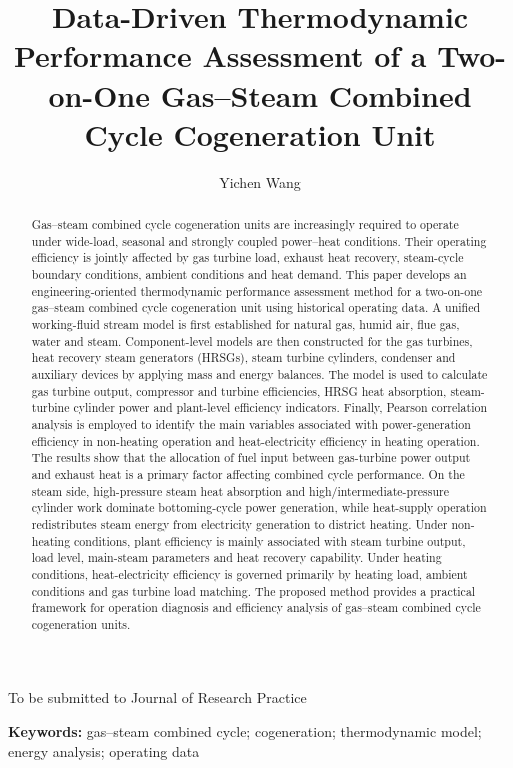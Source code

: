 \documentclass[12pt,a4paper]{article}
\title{\textbf{Data-Driven Thermodynamic Performance Assessment of a Two-on-One Gas--Steam Combined Cycle Cogeneration Unit}}
\author[1]{Yichen Wang}
\affil[1]{Department of Energy and Power Engineering, Tsinghua University, Beijing 100084, China}
\date{}
\begin{document}
\begin{center}
\small To be submitted to Journal of Research Practice
\end{center}
\maketitle

\begin{abstract}
Gas--steam combined cycle cogeneration units are increasingly required to operate under wide-load, seasonal and strongly coupled power--heat conditions. Their operating efficiency is jointly affected by gas turbine load, exhaust heat recovery, steam-cycle boundary conditions, ambient conditions and heat demand. This paper develops an engineering-oriented thermodynamic performance assessment method for a two-on-one gas--steam combined cycle cogeneration unit using historical operating data. A unified working-fluid stream model is first established for natural gas, humid air, flue gas, water and steam. Component-level models are then constructed for the gas turbines, heat recovery steam generators (HRSGs), steam turbine cylinders, condenser and auxiliary devices by applying mass and energy balances. The model is used to calculate gas turbine output, compressor and turbine efficiencies, HRSG heat absorption, steam-turbine cylinder power and plant-level efficiency indicators. Finally, Pearson correlation analysis is employed to identify the main variables associated with power-generation efficiency in non-heating operation and heat-electricity efficiency in heating operation. The results show that the allocation of fuel input between gas-turbine power output and exhaust heat is a primary factor affecting combined cycle performance. On the steam side, high-pressure steam heat absorption and high/intermediate-pressure cylinder work dominate bottoming-cycle power generation, while heat-supply operation redistributes steam energy from electricity generation to district heating. Under non-heating conditions, plant efficiency is mainly associated with steam turbine output, load level, main-steam parameters and heat recovery capability. Under heating conditions, heat-electricity efficiency is governed primarily by heating load, ambient conditions and gas turbine load matching. The proposed method provides a practical framework for operation diagnosis and efficiency analysis of gas--steam combined cycle cogeneration units.
\end{abstract}

\noindent\textbf{Keywords:} gas--steam combined cycle; cogeneration; thermodynamic model; energy analysis; operating data
\end{document}
